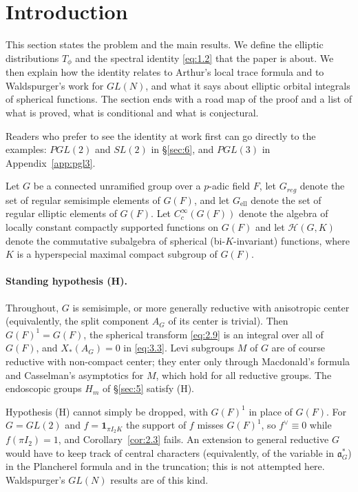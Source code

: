 \documentclass[12pt,letterpaper]{article}
\numberwithin{equation}{section}
\theoremstyle{plain}
\theoremstyle{remark}
\theoremstyle{plain}
\theoremstyle{definition}
\theoremstyle{remark}
\theoremstyle{remark}
\newcommand{\Hc}{\mathcal{H}}
\newcommand{\fa}{\mathfrak{a}}
\newcommand{\one}{\mathbf 1}
\newcommand{\ellr}{\mathrm{ell}}
\begin{document}
\tableofcontents

\section{Introduction}\label{sec:1}

This section states the problem and the main results. We define the elliptic distributions $T_\phi$ and the spectral identity \eqref{eq:1.2} that the paper is about. We then explain how the identity relates to Arthur's local trace formula and to Waldspurger's work for $GL(N)$, and what it says about elliptic orbital integrals of spherical functions. The section ends with a road map of the proof and a list of what is proved, what is conditional and what is conjectural.

Readers who prefer to see the identity at work first can go directly to the examples: $PGL(2)$ and $SL(2)$ in \S\ref{sec:6}, and $PGL(3)$ in Appendix~\ref{app:pgl3}.


Let $G$ be a connected unramified group over a $p$-adic field $F$, let $G_{reg}$ denote the set of regular semisimple elements of $G(F)$, and let $G_{\ellr}$ denote the set of regular elliptic elements of $G(F)$. Let $C_c^\infty(G(F))$ denote the algebra of locally constant compactly supported functions on $G(F)$ and let $\Hc(G,K)$ denote the commutative subalgebra of spherical (bi-$K$-invariant) functions, where $K$ is a hyperspecial maximal compact subgroup of $G(F)$.

\paragraph{Standing hypothesis (H).} Throughout, $G$ is semisimple, or more generally reductive with anisotropic center (equivalently, the split component $A_G$ of its center is trivial). Then $G(F)^1=G(F)$, the spherical transform \eqref{eq:2.9} is an integral over all of $G(F)$, and $X_*(A_G)=0$ in \eqref{eq:3.3}. Levi subgroups $M$ of $G$ are of course reductive with non-compact center; they enter only through Macdonald's formula and Casselman's asymptotics for $M$, which hold for all reductive groups. The endoscopic groups $H_m$ of \S\ref{sec:5} satisfy (H).

\begin{rem26}[scope]\label{r:scope}
Hypothesis (H) cannot simply be dropped, with $G(F)^1$ in place of $G(F)$. For $G=GL(2)$ and $f=\one_{\pi I_2K}$ the support of $f$ misses $G(F)^1$, so $f^\vee\equiv0$ while $f(\pi I_2)=1$, and Corollary~\ref{cor:2.3} fails. An extension to general reductive $G$ would have to keep track of central characters (equivalently, of the variable in $\fa_G^*$) in the Plancherel formula and in the truncation; this is not attempted here. Waldspurger's $GL(N)$ results \cite{Wa89a} are of this kind.
\end{rem26}
\end{document}
